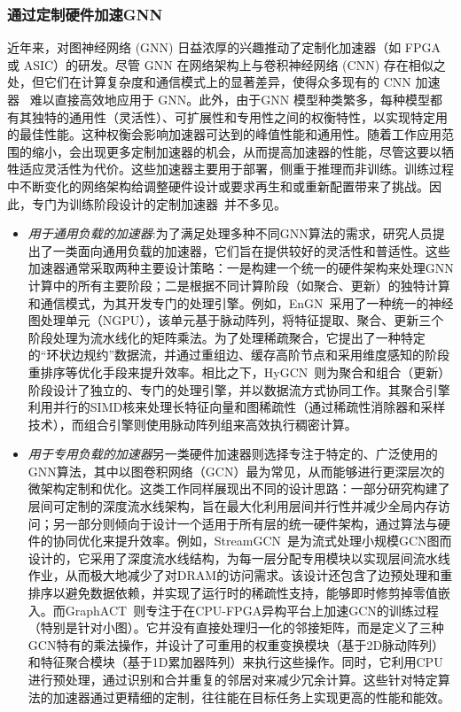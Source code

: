 \subsubsection{通过定制硬件加速GNN}
近年来，对图神经网络 (GNN) 日益浓厚的兴趣推动了定制化加速器（如 FPGA 或 ASIC）的研发。尽管 GNN 在网络架构上与卷积神经网络 (CNN) 存在相似之处，但它们在计算复杂度和通信模式上的显著差异，使得众多现有的 CNN 加速器~\cite{flexcnn, zhang2018dnnbuilder} 难以直接高效地应用于 GNN。此外，由于GNN 模型种类繁多，每种模型都有其独特的通用性（灵活性）、可扩展性和专用性之间的权衡特性，以实现特定用的最佳性能。这种权衡会影响加速器可达到的峰值性能和通用性。随着工作应用范围的缩小，会出现更多定制加速器的机会，从而提高加速器的性能，尽管这要以牺牲适应灵活性为代价。这些加速器主要用于部署，侧重于推理而非训练。训练过程中不断变化的网络架构给调整硬件设计或要求再生和或重新配置带来了挑战。因此，专门为训练阶段设计的定制加速器~\cite{zeng2020graphact,chen2021rubik}并不多见。
\begin{itemize}
    \item \textit{用于通用负载的加速器}:为了满足处理多种不同GNN算法的需求，研究人员提出了一类面向通用负载的加速器，它们旨在提供较好的灵活性和普适性。这些加速器通常采取两种主要设计策略：一是构建一个统一的硬件架构来处理GNN计算中的所有主要阶段；二是根据不同计算阶段（如聚合、更新）的独特计算和通信模式，为其开发专门的处理引擎。例如，EnGN~\cite{liang2020engn}采用了一种统一的神经图处理单元（NGPU），该单元基于脉动阵列，将特征提取、聚合、更新三个阶段处理为流水线化的矩阵乘法。为了处理稀疏聚合，它提出了一种特定的“环状边规约”数据流，并通过重组边、缓存高阶节点和采用维度感知的阶段重排序等优化手段来提升效率。相比之下，HyGCN~\cite{yan2020hygcn}则为聚合和组合（更新）阶段设计了独立的、专门的处理引擎，并以数据流方式协同工作。其聚合引擎利用并行的SIMD核来处理长特征向量和图稀疏性（通过稀疏性消除器和采样技术），而组合引擎则使用脉动阵列组来高效执行稠密计算。
    \item \textit{用于专用负载的加速器}另一类硬件加速器则选择专注于特定的、广泛使用的GNN算法，其中以图卷积网络（GCN）最为常见，从而能够进行更深层次的微架构定制和优化。这类工作同样展现出不同的设计思路：一部分研究构建了层间可定制的深度流水线架构，旨在最大化利用层间并行性并减少全局内存访问；另一部分则倾向于设计一个适用于所有层的统一硬件架构，通过算法与硬件的协同优化来提升效率。例如，StreamGCN~\cite{sohrabizadeh2022streamgcn}是为流式处理小规模GCN图而设计的，它采用了深度流水线结构，为每一层分配专用模块以实现层间流水线作业，从而极大地减少了对DRAM的访问需求。该设计还包含了边预处理和重排序以避免数据依赖，并实现了运行时的稀疏性支持，能够即时修剪掉零值嵌入。而GraphACT~\cite{zeng2020graphact}则专注于在CPU-FPGA异构平台上加速GCN的训练过程（特别是针对小图）。它并没有直接处理归一化的邻接矩阵，而是定义了三种GCN特有的乘法操作，并设计了可重用的权重变换模块（基于2D脉动阵列）和特征聚合模块（基于1D累加器阵列）来执行这些操作。同时，它利用CPU进行预处理，通过识别和合并重复的邻居对来减少冗余计算。这些针对特定算法的加速器通过更精细的定制，往往能在目标任务上实现更高的性能和能效。
\end{itemize}
